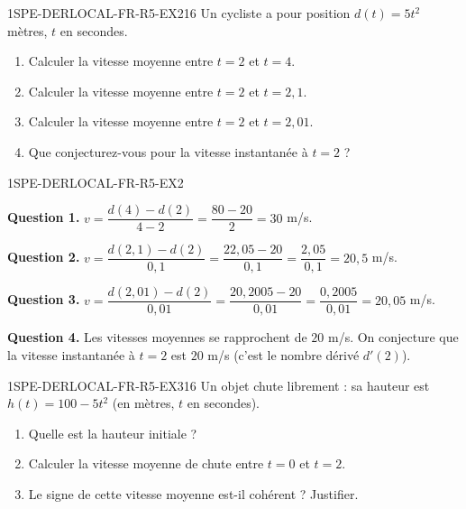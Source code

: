 
\begin{exercice}{1SPE-DERLOCAL-FR-R5-EX2}{1}{6}
Un cycliste a pour position $d(t) = 5t^2$ mètres, $t$ en secondes.
\begin{enumerate}
  \item Calculer la vitesse moyenne entre $t=2$ et $t=4$.
  \item Calculer la vitesse moyenne entre $t=2$ et $t=2{,}1$.
  \item Calculer la vitesse moyenne entre $t=2$ et $t=2{,}01$.
  \item Que conjecturez-vous pour la vitesse instantanée à $t=2$ ?
\end{enumerate}
\end{exercice}


\begin{corrige}{1SPE-DERLOCAL-FR-R5-EX2}

\textbf{Question 1.}
$v = \dfrac{d(4)-d(2)}{4-2} = \dfrac{80-20}{2} = 30$ m/s.

\textbf{Question 2.}
$v = \dfrac{d(2{,}1)-d(2)}{0{,}1} = \dfrac{22{,}05-20}{0{,}1} = \dfrac{2{,}05}{0{,}1} = 20{,}5$ m/s.

\textbf{Question 3.}
$v = \dfrac{d(2{,}01)-d(2)}{0{,}01} = \dfrac{20{,}2005-20}{0{,}01} = \dfrac{0{,}2005}{0{,}01} = 20{,}05$ m/s.


\textbf{Question 4.} Les vitesses moyennes se rapprochent de $20$ m/s. On conjecture que la vitesse instantanée à $t=2$ est $20$ m/s (c'est le nombre dérivé $d'(2)$).

\end{corrige}


\begin{exercice}{1SPE-DERLOCAL-FR-R5-EX3}{1}{6}
Un objet chute librement : sa hauteur est $h(t) = 100 - 5t^2$ (en mètres, $t$ en secondes).
\begin{enumerate}
  \item Quelle est la hauteur initiale ?
  \item Calculer la vitesse moyenne de chute entre $t=0$ et $t=2$.
  \item Le signe de cette vitesse moyenne est-il cohérent ? Justifier.
\end{enumerate}
\end{exercice}

